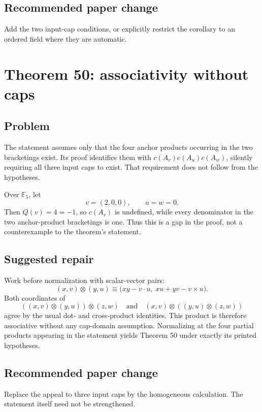 \documentclass[11pt]{article}
\newcommand{\F}{\mathbb F}
\begin{document}
\subsection{Recommended paper change}

Add the two input-cap conditions, or explicitly restrict the corollary to an
ordered field where they are automatic.

\section{Theorem 50: associativity without caps}

\subsection{Problem}

The statement assumes only that the four anchor products occurring in the
two bracketings exist.  Its proof identifies them with
\(c(A_v)c(A_u)c(A_w)\), silently requiring all three input caps to exist.
That requirement does not follow from the hypotheses.

Over \(\F_5\), let
\[
 v=(2,0,0),\qquad u=w=0.
\]
Then \(Q(v)=4=-1\), so \(c(A_v)\) is undefined, while every denominator in
the two anchor-product bracketings is one.  Thus this is a gap in the proof,
not a counterexample to the theorem's statement.

\subsection{Suggested repair}

Work before normalization with scalar-vector pairs:
\[
 (x,v)\otimes(y,u)\equiv
 \bigl(xy-v\mathbin{\cdot}u,\;xu+yv-v\times u\bigr).
\]
Both coordinates of
\[
 ((x,v)\otimes(y,u))\otimes(z,w)
 \quad\text{and}\quad
 (x,v)\otimes((y,u)\otimes(z,w))
\]
agree by the usual dot- and cross-product identities.  This product is
therefore associative without any cap-domain assumption.  Normalizing at
the four partial products appearing in the statement yields Theorem 50 under
exactly its printed hypotheses.

\subsection{Recommended paper change}

Replace the appeal to three input caps by the homogeneous calculation.  The
statement itself need not be strengthened.
\end{document}
